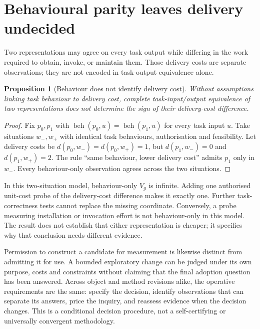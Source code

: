 \documentclass[11pt,letterpaper]{article}
\newtheorem{proposition}[theorem]{Proposition}
\newcommand{\beh}{\operatorname{beh}}
\begin{document}
\section{Behavioural parity leaves delivery undecided}
Two representations may agree on every task output while differing in the work required to obtain, invoke, or maintain them. Those delivery costs are separate observations; they are not encoded in task-output equivalence alone.

\begin{proposition}[Behaviour does not identify delivery cost]
Without assumptions linking task behaviour to delivery cost, complete task-input/output equivalence of two representations does not determine the sign of their delivery-cost difference.
\end{proposition}
\begin{proof}
Fix $p_0,p_1$ with $\beh(p_0,u)=\beh(p_1,u)$ for every task input $u$. Take situations $w_-,w_+$ with identical task behaviours, authorisation and feasibility. Let delivery costs be
$d(p_0,w_-)=d(p_0,w_+)=1$, but
$d(p_1,w_-)=0$ and $d(p_1,w_+)=2$.
The rule ``same behaviour, lower delivery cost'' admits $p_1$ only in $w_-$. Every behaviour-only observation agrees across the two situations.
\end{proof}

In this two-situation model, behaviour-only $V_g$ is infinite. Adding one authorised unit-cost probe of the delivery-cost difference makes it exactly one. Further task-correctness tests cannot replace the missing coordinate. Conversely, a probe measuring installation or invocation effort is not behaviour-only in this model. The result does not establish that either representation is cheaper; it specifies why that conclusion needs different evidence.

Permission to construct a candidate for measurement is likewise distinct from admitting it for use. A bounded exploratory change can be judged under its own purpose, costs and constraints without claiming that the final adoption question has been answered. Across object and method revisions alike, the operative requirements are the same: specify the decision, identify observations that can separate its answers, price the inquiry, and reassess evidence when the decision changes. This is a conditional decision procedure, not a self-certifying or universally convergent methodology.
\end{document}

